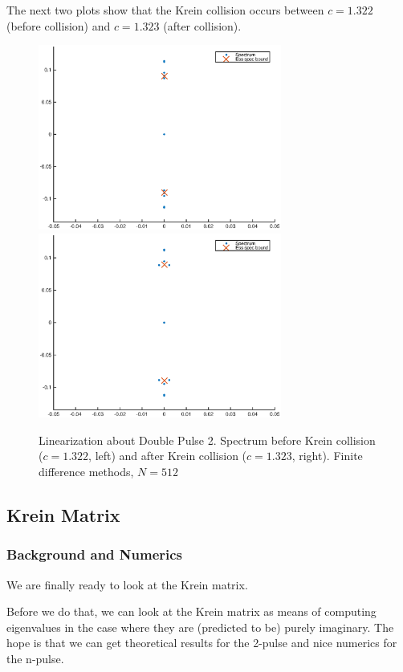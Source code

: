 \documentclass[12pt]{article}
\begin{document}
The next two plots show that the Krein collision occurs between $c = 1.322$ (before collision) and $c = 1.323$ (after collision).

\begin{figure}[H]
\centering
\includegraphics[width=8cm]{spec1322_double2.eps}
\includegraphics[width=8cm]{spec1323_double2.eps}
\caption{Linearization about Double Pulse 2. Spectrum before Krein collision ($c = 1.322$, left) and after Krein collision ($c = 1.323$, right). Finite difference methods, $N = 512$}
\end{figure}

\subsection{Krein Matrix}

\subsubsection{Background and Numerics}

We are finally ready to look at the Krein matrix.

Before we do that, we can look at the Krein matrix as means of computing eigenvalues in the case where they are (predicted to be) purely imaginary. The hope is that we can get theoretical results for the 2-pulse and nice numerics for the n-pulse.
\\
\end{document}
